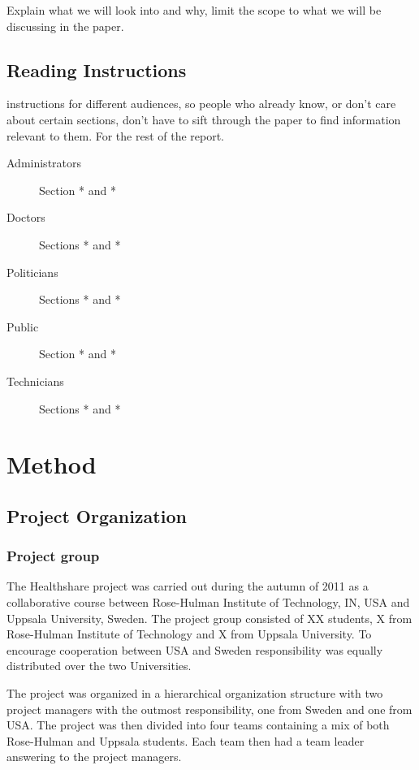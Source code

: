 \documentclass[14pt]{article}
\begin{document}
Explain what we will look into and why, limit the scope to what we will be discussing in the paper.

\subsection{Reading Instructions}
instructions for different audiences, so people who already know, or don't care about certain sections, don't have to sift through the paper to find information relevant to them. For the rest of the report.

\begin{description}
\item[Administrators] Section * and *
\item[Doctors] Sections * and *
\item[Politicians] Sections * and *
\item[Public] Section * and *
\item[Technicians] Sections * and *
\end{description}

\newpage

\section{Method}
\label{sec:Method}

\subsection{Project Organization}
\subsubsection{Project group}
The Healthshare project was carried out during the autumn of 2011 as a collaborative course between Rose-Hulman Institute of Technology, IN, USA and Uppsala University, Sweden.
The project group consisted of XX students, X from Rose-Hulman Institute of Technology and X from Uppsala University. To encourage cooperation between USA and Sweden responsibility was equally distributed over the two Universities.

The project was organized in a hierarchical organization structure with two project managers with the outmost responsibility, one from Sweden and one from USA. The project was then divided into four teams containing a mix of both Rose-Hulman and Uppsala students. Each team then had a team leader answering to the project managers.
\end{document}
